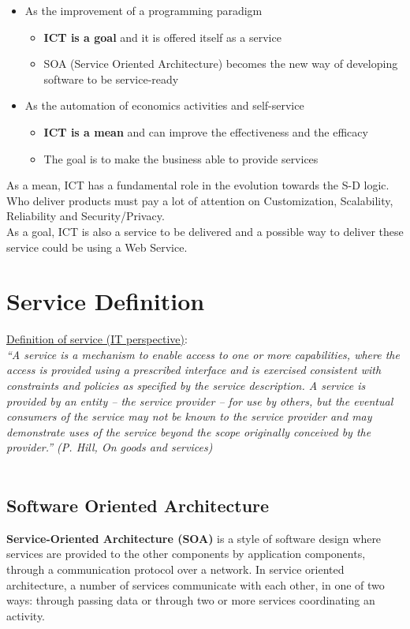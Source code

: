 \documentclass[10pt,a4paper]{article}
\begin{document}
\begin{itemize}
	\item As the improvement of a programming paradigm
	\begin{itemize}
		\item \textbf{ICT is a goal} and it is offered itself as a service
		\item SOA (Service Oriented Architecture) becomes the new way of developing software to be service-ready
		\end{itemize}
\item As the automation of economics activities and self-service
	\begin{itemize}
		\item \textbf{ICT is a mean} and can improve the effectiveness and the efficacy
		\item The goal is to make the business able to provide services
	\end{itemize}
\end{itemize}
As a mean, ICT has a fundamental role in the evolution towards the S-D logic. Who deliver products must pay a lot of attention on Customization, Scalability, Reliability and Security/Privacy. \\
As a goal, ICT is also a service to be delivered and a possible way to deliver these service could be using a Web Service.
\section{\LARGE Service Definition}
\uline{Definition of service (IT perspective)}: \\
\textit{“A service is a mechanism to enable access to one or more capabilities, where the access is provided using a prescribed interface and is exercised consistent with constraints and policies as specified by the service description. A service is provided by an entity – the service provider – for use by others, but the eventual consumers of the service may not be known to the service provider and may demonstrate uses of the service beyond the scope originally conceived by the provider.”  (P. Hill, On goods and services)} \\ \\
\subsection{Software Oriented Architecture}
\textbf{Service-Oriented Architecture (SOA)} is a style of software design where services are provided to the other components by application components, through a communication protocol over a network. In service oriented architecture, a number of services communicate with each other, in one of two ways: through passing data or through two or more services coordinating an activity. \\
\end{document}
